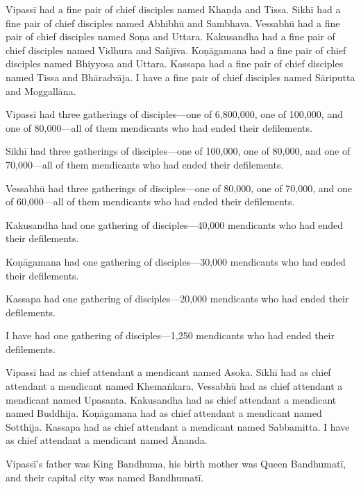 \documentclass[12pt,openany]{book}%
\begin{document}
\textsanskrit{Vipassī} had a fine pair of chief disciples named \textsanskrit{Khaṇḍa} and Tissa. \textsanskrit{Sikhī} had a fine pair of chief disciples named \textsanskrit{Abhibhū} and Sambhava. \textsanskrit{Vessabhū} had a fine pair of chief disciples named \textsanskrit{Soṇa} and Uttara. Kakusandha had a fine pair of chief disciples named Vidhura and \textsanskrit{Sañjīva}. \textsanskrit{Koṇāgamana} had a fine pair of chief disciples named Bhiyyosa and Uttara. Kassapa had a fine pair of chief disciples named Tissa and \textsanskrit{Bhāradvāja}. I have a fine pair of chief disciples named \textsanskrit{Sāriputta} and \textsanskrit{Moggallāna}. 

\textsanskrit{Vipassī} had three gatherings of disciples—one of 6,800,000, one of 100,000, and one of 80,000—all of them mendicants who had ended their defilements. 

\textsanskrit{Sikhī} had three gatherings of disciples—one of 100,000, one of 80,000, and one of 70,000—all of them mendicants who had ended their defilements. 

\textsanskrit{Vessabhū} had three gatherings of disciples—one of 80,000, one of 70,000, and one of 60,000—all of them mendicants who had ended their defilements. 

Kakusandha had one gathering of disciples—40,000 mendicants who had ended their defilements. 

\textsanskrit{Koṇāgamana} had one gathering of disciples—30,000 mendicants who had ended their defilements. 

Kassapa had one gathering of disciples—20,000 mendicants who had ended their defilements. 

I have had one gathering of disciples—1,250 mendicants who had ended their defilements. 

\textsanskrit{Vipassī} had as chief attendant a mendicant named Asoka. \textsanskrit{Sikhī} had as chief attendant a mendicant named \textsanskrit{Khemaṅkara}. \textsanskrit{Vessabhū} had as chief attendant a mendicant named Upasanta. Kakusandha had as chief attendant a mendicant named Buddhija. \textsanskrit{Koṇāgamana} had as chief attendant a mendicant named Sotthija. Kassapa had as chief attendant a mendicant named Sabbamitta. I have as chief attendant a mendicant named Ānanda. 

\textsanskrit{Vipassī}’s father was King Bandhuma, his birth mother was Queen \textsanskrit{Bandhumatī}, and their capital city was named \textsanskrit{Bandhumatī}. 
\end{document}
